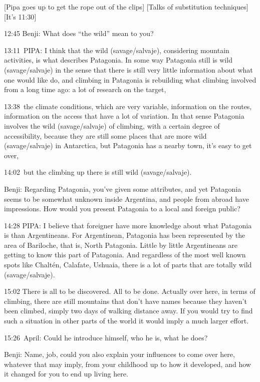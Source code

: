 {[}Pipa goes up to get the rope out of the clips{]} {[}Talks of
substitution techniques{]}{[}It's 11:30{]}

12:45 Benji: What does ``the wild'' mean to you?

13:11~PIPA: I think that the wild (savage/salvaje), considering mountain
activities, is what describes Patagonia. In some way Patagonia still is
wild (savage/salvaje) in the sense that there is still very little
information about what one would like do, and climbing in Patagonia is
rebuilding what climbing involved from a long time ago: a lot of
research on the target,

13:38~the climate conditions, which are very variable, information on
the routes, information on the access that have a lot of variation. In
that sense Patagonia involves the wild (savage/salvaje) of climbing,
with a certain degree of accessibility, because they are still some
places that are more wild (savage/salvaje) in Antarctica, but Patagonia
has a nearby town, it's easy to get over,

14:02~but the climbing up there is still wild (savage/salvaje).

Benji: Regarding Patagonia, you've given some attributes, and yet
Patagonia seems to be somewhat unknown inside Argentina, and people from
abroad have impressions. How would you present Patagonia to a local and
foreign public?

14:28 PIPA: I believe that foreigner have more knowledge about what
Patagonia is than Argentineans. For Argentinean, Patagonia has been
represented by the area of Bariloche, that is, North Patagonia. Little
by little Argentineans are getting to know this part of Patagonia. And
regardless of the most well known spots like Chaltén, Calafate, Ushuaia,
there is a lot of parts that are totally wild (savage/salvaje).

15:02 There is all to be discovered. All to be done. Actually over here,
in terms of climbing, there are still mountains that don't have names
because they haven't been climbed, simply two days of walking distance
away. If you would try to find such a situation in other parts of the
world it would imply a much larger effort.

15:26~April: Could he introduce himself, who he is, what he does?

Benji: Name, job, could you also explain your influences to come over
here, whatever that may imply, from your childhood up to how it
developed, and how it changed for you to end up living here.

